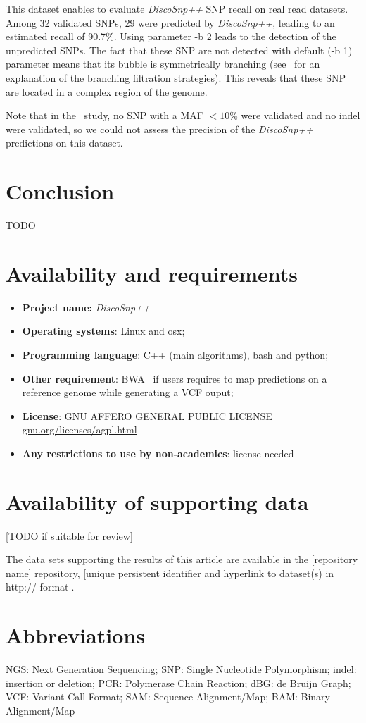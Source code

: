 \documentclass{bmcart}
\newcommand{\discopp}{{\it DiscoSnp++}\xspace}
\begin{document}
This dataset enables to evaluate \discopp SNP recall on real read datasets. Among 32 validated SNPs, 29 were predicted by \discopp, leading to an estimated recall of 90.7\%. Using parameter -b 2 leads to the detection of the unpredicted SNPs. The fact that these SNP are not detected with default (-b 1) parameter means that its bubble is symmetrically branching (see~\cite{Uricaru2014a} for an explanation of the branching filtration strategies). This reveals that these SNP are located in a complex region of the genome. 

Note that in the~\cite{Kvitek2013} study, no SNP with a MAF $<10\%$ were validated and no indel were validated, so we could not assess the precision of the \discopp predictions on this dataset.


\section*{Conclusion}
TODO
\section*{Availability and requirements}
\begin{itemize}
	\item \textbf{Project name:} \discopp
	\item \textbf{Operating systems}: Linux and osx;
	\item \textbf{Programming language}: C++ (main algorithms), bash and python;
	\item \textbf{Other requirement}: BWA~\cite{bwa} if users requires to map predictions on a reference genome while generating a VCF ouput;
	\item \textbf{License}: GNU AFFERO GENERAL PUBLIC LICENSE \url{gnu.org/licenses/agpl.html}
	\item \textbf{Any restrictions to use by non-academics}: license needed
\end{itemize}


\section*{Availability of supporting data}
[TODO if suitable for review]

The data sets supporting the results of this article are available in the [repository name] repository, [unique persistent identifier and hyperlink to dataset(s) in http:// format].


\section*{Abbreviations}
NGS: Next Generation Sequencing; SNP: Single Nucleotide Polymorphism; indel: insertion or deletion; PCR: Polymerase Chain Reaction; dBG: de Bruijn Graph; VCF: Variant Call Format; SAM: Sequence Alignment/Map; BAM: Binary Alignment/Map
\end{document}
